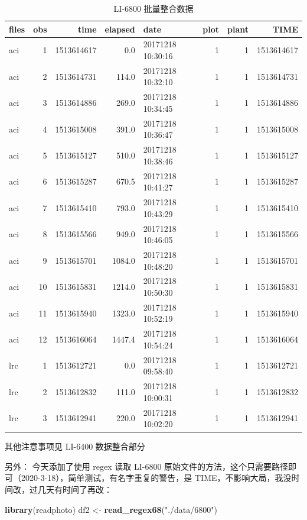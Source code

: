 \documentclass[
]{krantz}
\makeatletter
\newenvironment{Shaded}{\begin{snugshade}}{\end{snugshade}}
\newcommand{\KeywordTok}[1]{\textcolor[rgb]{0.13,0.29,0.53}{\textbf{#1}}}
\newcommand{\NormalTok}[1]{#1}
\newcommand{\StringTok}[1]{\textcolor[rgb]{0.31,0.60,0.02}{#1}}
\newenvironment{kframe}{%
\medskip{}
\setlength{\fboxsep}{.8em}
 \def\at@end@of@kframe{}%
 \ifinner\ifhmode%
  \def\at@end@of@kframe{\end{minipage}}%
  \begin{minipage}{\columnwidth}%
 \fi\fi%
 \def\FrameCommand##1{\hskip\@totalleftmargin \hskip-\fboxsep
 \colorbox{shadecolor}{##1}\hskip-\fboxsep
     \hskip-\linewidth \hskip-\@totalleftmargin \hskip\columnwidth}%
 \MakeFramed {\advance\hsize-\width
   \@totalleftmargin\z@ \linewidth\hsize
   \@setminipage}}%
 {\par\unskip\endMakeFramed%
 \at@end@of@kframe}
\renewenvironment{Shaded}{\begin{kframe}}{\end{kframe}}
\makeatother
\begin{document}
\begin{table}

\caption{\label{tab:unnamed-chunk-8}LI-6800 批量整合数据}
\centering
\begin{tabular}[t]{lrrrlrrr}
\toprule
files & obs & time & elapsed & date & plot & plant & TIME\\
\midrule
aci & 1 & 1513614617 & 0.0 & 20171218 10:30:16 & 1 & 1 & 1513614617\\
aci & 2 & 1513614731 & 114.0 & 20171218 10:32:10 & 1 & 1 & 1513614731\\
aci & 3 & 1513614886 & 269.0 & 20171218 10:34:45 & 1 & 1 & 1513614886\\
aci & 4 & 1513615008 & 391.0 & 20171218 10:36:47 & 1 & 1 & 1513615008\\
aci & 5 & 1513615127 & 510.0 & 20171218 10:38:46 & 1 & 1 & 1513615127\\
\addlinespace
aci & 6 & 1513615287 & 670.5 & 20171218 10:41:27 & 1 & 1 & 1513615287\\
aci & 7 & 1513615410 & 793.0 & 20171218 10:43:29 & 1 & 1 & 1513615410\\
aci & 8 & 1513615566 & 949.0 & 20171218 10:46:05 & 1 & 1 & 1513615566\\
aci & 9 & 1513615701 & 1084.0 & 20171218 10:48:20 & 1 & 1 & 1513615701\\
aci & 10 & 1513615831 & 1214.0 & 20171218 10:50:30 & 1 & 1 & 1513615831\\
\addlinespace
aci & 11 & 1513615940 & 1323.0 & 20171218 10:52:19 & 1 & 1 & 1513615940\\
aci & 12 & 1513616064 & 1447.4 & 20171218 10:54:24 & 1 & 1 & 1513616064\\
lrc & 1 & 1513612721 & 0.0 & 20171218 09:58:40 & 1 & 1 & 1513612721\\
lrc & 2 & 1513612832 & 111.0 & 20171218 10:00:31 & 1 & 1 & 1513612832\\
lrc & 3 & 1513612941 & 220.0 & 20171218 10:02:20 & 1 & 1 & 1513612941\\
\bottomrule
\end{tabular}
\end{table}

其他注意事项见 LI-6400 数据整合部分

另外： 今天添加了使用 regex 读取 LI-6800 原始文件的方法，这个只需要路径即可（2020-3-18），简单测试，有名字重复的警告，是 TIME，不影响大局，我没时间改，过几天有时间了再改：

\begin{Shaded}
\begin{Highlighting}[]
\KeywordTok{library}\NormalTok{(readphoto)}
\NormalTok{df2 <-}\StringTok{ }\KeywordTok{read_regex68}\NormalTok{(}\StringTok{"./data/6800"}\NormalTok{)}
\end{Highlighting}
\end{Shaded}
\end{document}
